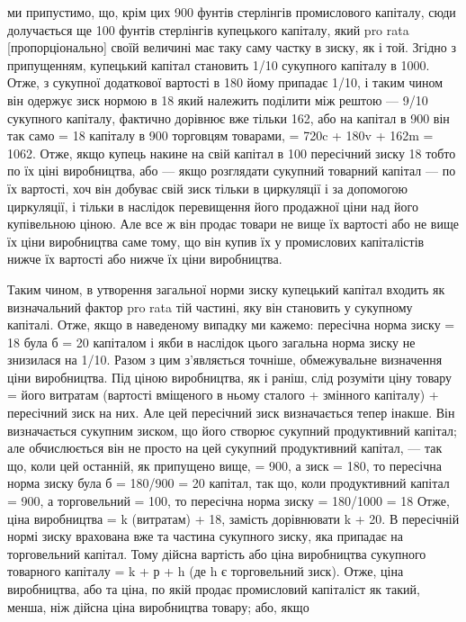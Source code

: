 ми припустимо, що, крім цих 900 фунтів стерлінгів промислового
капіталу, сюди долучається ще 100 фунтів стерлінгів купецького
капіталу, який pro rata [пропорціонально] своїй величині має
таку саму частку в зиску, як і той. Згідно з припущенням,
купецький капітал становить 1/10 сукупного капіталу в 1000.
Отже, з сукупної додаткової вартості в 180 йому припадає 1/10,
і таким чином він одержує зиск нормою в 18%
який належить поділити між рештою — 9/10 сукупного капіталу,
фактично дорівнює вже тільки 162, або на капітал в 900 він так
само = 18%
капіталу в 900 торговцям товарами, = 720c + 180v + 162m = 1062.
Отже, якщо купець накине на свій капітал
в 100 пересічний зиску 18%
тобто по їх ціні виробництва, або — якщо розглядати
сукупний товарний капітал — по їх вартості, хоч він добуває
свій зиск тільки в циркуляції і за допомогою циркуляції, і тільки
в наслідок перевищення його продажної ціни над його купівельною
ціною. Але все ж він продає товари не вище їх вартості
або не вище їх ціни виробництва саме тому, що він купив їх
у промислових капіталістів нижче їх вартості або нижче їх ціни
виробництва.

Таким чином, в утворення загальної норми зиску купецький
капітал входить як визначальний фактор pro rata тій частині,
яку він становить у сукупному капіталі. Отже, якщо в наведеному
випадку ми кажемо: пересічна норма зиску = 18%
була б = 20%
капіталом і якби в наслідок цього загальна норма зиску не знизилася
на 1/10. Разом з цим з’являється точніше, обмежувальне визначення
ціни виробництва. Під ціною виробництва, як і раніш,
слід розуміти ціну товару = його витратам (вартості вміщеного
в ньому сталого + змінного капіталу) + пересічний зиск на них.
Але цей пересічний зиск визначається тепер інакше. Він визначається
сукупним зиском, що його створює сукупний продуктивний
капітал; але обчислюється він не просто на цей сукупний
продуктивний капітал, — так що, коли цей останній, як
припущено вище, = 900, а зиск = 180, то пересічна норма зиску
була б = 180/900 = 20%
капітал, так що, коли продуктивний капітал = 900, а торговельний = 100, то пересічна норма зиску =
180/1000 = 18%
Отже, ціна виробництва = k (витратам) + 18, замість дорівнювати
k + 20. В пересічній нормі зиску врахована вже та частина
сукупного зиску, яка припадає на торговельний капітал. Тому
дійсна вартість або ціна виробництва сукупного товарного капіталу
= k + р + h (де h є торговельний зиск). Отже, ціна виробництва,
або та ціна, по якій продає промисловий капіталіст як
такий, менша, ніж дійсна ціна виробництва товару; або, якщо

